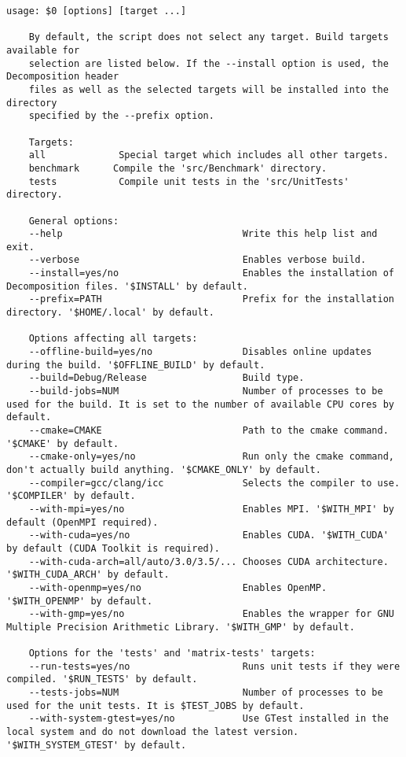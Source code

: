 \begin{lstlisting}[language={},caption={Decomposition project's \code{build} script usage. Taken from the Decomposition project repository on GitLab\protect\footref{Footnote:decomposition-project-gitlab-url}.},label={Listing:decomposition-project-build-script-usage}]
	usage: $0 [options] [target ...]
	
	By default, the script does not select any target. Build targets available for
	selection are listed below. If the --install option is used, the Decomposition header
	files as well as the selected targets will be installed into the directory
	specified by the --prefix option.
	
	Targets:
	all             Special target which includes all other targets.
	benchmark      Compile the 'src/Benchmark' directory.
	tests           Compile unit tests in the 'src/UnitTests' directory.
	
	General options:
	--help                                Write this help list and exit.
	--verbose                             Enables verbose build.
	--install=yes/no                      Enables the installation of Decomposition files. '$INSTALL' by default.
	--prefix=PATH                         Prefix for the installation directory. '$HOME/.local' by default.
	
	Options affecting all targets:
	--offline-build=yes/no                Disables online updates during the build. '$OFFLINE_BUILD' by default.
	--build=Debug/Release                 Build type.
	--build-jobs=NUM                      Number of processes to be used for the build. It is set to the number of available CPU cores by default.
	--cmake=CMAKE                         Path to the cmake command. '$CMAKE' by default.
	--cmake-only=yes/no                   Run only the cmake command, don't actually build anything. '$CMAKE_ONLY' by default.
	--compiler=gcc/clang/icc              Selects the compiler to use. '$COMPILER' by default.
	--with-mpi=yes/no                     Enables MPI. '$WITH_MPI' by default (OpenMPI required).
	--with-cuda=yes/no                    Enables CUDA. '$WITH_CUDA' by default (CUDA Toolkit is required).
	--with-cuda-arch=all/auto/3.0/3.5/... Chooses CUDA architecture. '$WITH_CUDA_ARCH' by default.
	--with-openmp=yes/no                  Enables OpenMP. '$WITH_OPENMP' by default.
	--with-gmp=yes/no                     Enables the wrapper for GNU Multiple Precision Arithmetic Library. '$WITH_GMP' by default.
	
	Options for the 'tests' and 'matrix-tests' targets:
	--run-tests=yes/no                    Runs unit tests if they were compiled. '$RUN_TESTS' by default.
	--tests-jobs=NUM                      Number of processes to be used for the unit tests. It is $TEST_JOBS by default.
	--with-system-gtest=yes/no            Use GTest installed in the local system and do not download the latest version. '$WITH_SYSTEM_GTEST' by default.
\end{lstlisting}




